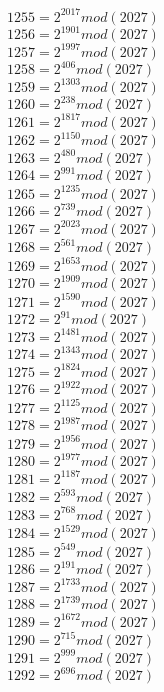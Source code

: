 \documentclass[12pt, letterpaper]{article}
\begin{document}
\begin{itemize}
\begin{multicols}{3}
$1255= 2^{2017} mod (2027)$\\
$1256= 2^{1901} mod (2027)$\\
$1257= 2^{1997} mod (2027)$\\
$1258= 2^{406} mod (2027)$\\
$1259= 2^{1303} mod (2027)$\\
$1260= 2^{238} mod (2027)$\\
$1261= 2^{1817} mod (2027)$\\
$1262= 2^{1150} mod (2027)$\\
$1263= 2^{480} mod (2027)$\\
$1264= 2^{991} mod (2027)$\\
$1265= 2^{1235} mod (2027)$\\
$1266= 2^{739} mod (2027)$\\
$1267= 2^{2023} mod (2027)$\\
$1268= 2^{561} mod (2027)$\\
$1269= 2^{1653} mod (2027)$\\
$1270= 2^{1909} mod (2027)$\\
$1271= 2^{1590} mod (2027)$\\
$1272= 2^{91} mod (2027)$\\
$1273= 2^{1481} mod (2027)$\\
$1274= 2^{1343} mod (2027)$\\
$1275= 2^{1824} mod (2027)$\\
$1276= 2^{1922} mod (2027)$\\
$1277= 2^{1125} mod (2027)$\\
$1278= 2^{1987} mod (2027)$\\
$1279= 2^{1956} mod (2027)$\\
$1280= 2^{1977} mod (2027)$\\
$1281= 2^{1187} mod (2027)$\\
$1282= 2^{593} mod (2027)$\\
$1283= 2^{768} mod (2027)$\\
$1284= 2^{1529} mod (2027)$\\
$1285= 2^{549} mod (2027)$\\
$1286= 2^{191} mod (2027)$\\
$1287= 2^{1733} mod (2027)$\\
$1288= 2^{1739} mod (2027)$\\
$1289= 2^{1672} mod (2027)$\\
$1290= 2^{715} mod (2027)$\\
$1291= 2^{999} mod (2027)$\\
$1292= 2^{696} mod (2027)$\\

\end{multicols}
\end{itemize}
\end{document}
